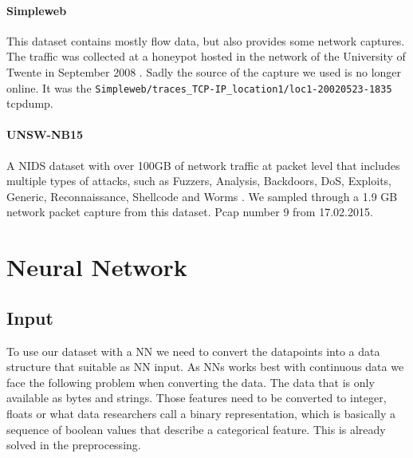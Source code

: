 \documentclass[
	ngerman,
	ruledheaders=section,%
	class=report,%
	thesis={type=bachelor},%
	accentcolor=9c,%
	custommargins=true,%
	marginpar=false,%
	parskip=half-,%
	fontsize=11pt,%
]{tudapub}
\begin{document}
\paragraph{Simpleweb} This dataset contains mostly flow data, but also provides some network captures.
The traffic was collected at a honeypot hosted in the network of the University of Twente in September 2008 \cite{LabeledDatasetIntrusiona}.
Sadly the source of the capture we used is no longer online.
It was the \lstinline{Simpleweb/traces_TCP-IP_location1/loc1-20020523-1835} tcpdump.

\paragraph{UNSW-NB15} A NIDS dataset with over 100GB of network traffic at packet level that includes multiple types of attacks, such as Fuzzers, Analysis, Backdoors, DoS, Exploits, Generic, Reconnaissance, Shellcode and Worms \cite{UNSWNB15DataSet}.
We sampled through a 1.9 GB network packet capture from this dataset.
Pcap number 9 from 17.02.2015.

\section{Neural Network}

\subsection{Input}

To use our dataset with a NN we need to convert the datapoints into a data structure that suitable as NN input.
As NNs works best with continuous data we face the following problem when converting the data.
The data that is only available as bytes and strings.
Those features need to be converted to integer, floats or what data researchers call a binary representation, which is basically a sequence of boolean values that describe a categorical feature.
This is already solved in the preprocessing.
\end{document}
